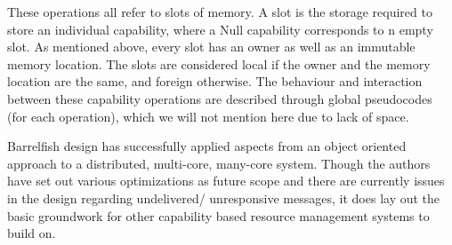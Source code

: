 These operations all refer to slots of memory. A slot is the storage required to store an individual capability, where a Null capability corresponds to n empty slot. As mentioned above, every slot has an owner as well as an immutable memory location. The slots are considered local if the owner and the memory location are the same, and foreign otherwise. The behaviour and interaction between these capability operations are described through global pseudocodes (for each operation), which we will not mention here due to lack of space.

Barrelfish design has successfully applied aspects from an object oriented approach to a distributed, multi-core, many-core system. Though the authors have set out various optimizations as future scope and there are currently issues in the design regarding undelivered/ unresponsive messages, it does lay out the basic groundwork for other capability based resource management systems  to build on.